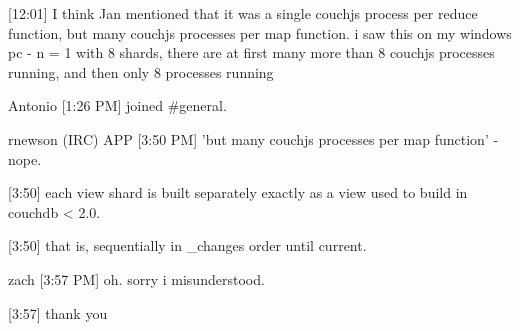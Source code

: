 [12:01]
I think Jan mentioned that it was a single couchjs process per reduce function, but many couchjs processes per map function. i saw this on my windows pc - n = 1 with 8 shards, there are at first many more than 8 couchjs processes running, and then only 8 processes running

Antonio [1:26 PM]
joined #general.

rnewson (IRC) APP [3:50 PM]
'but many couchjs processes per map function' - nope.

[3:50]
each view shard is built separately exactly as a view used to build in couchdb < 2.0.

[3:50]
that is, sequentially in _changes order until current.

zach [3:57 PM]
oh. sorry i misunderstood.

[3:57]
thank you